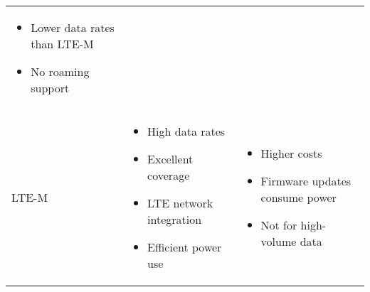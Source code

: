 \begin{table}[H]
\begin{tabularx}{\textwidth}{l X X}
\begin{itemize}
	\item Lower data rates than LTE-M
	\item No roaming support
\end{itemize}
\\
LTE-M &
\begin{itemize}
	\item High data rates
	\item Excellent coverage
	\item LTE network integration
	\item Efficient power use
\end{itemize}
&
\begin{itemize}
	\item Higher costs
	\item Firmware updates consume power
	\item Not for high-volume data
\end{itemize}
\\
\bottomrule
\end{tabularx}
\label{tab:lpwan_adv_disadv}
\end{table}

